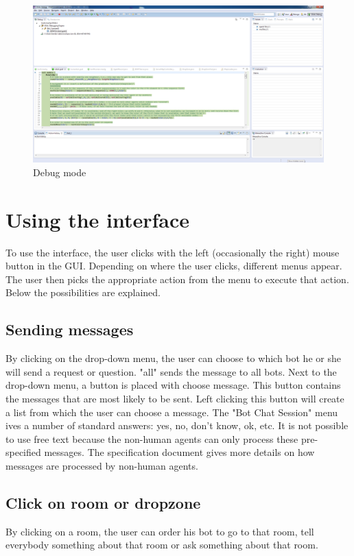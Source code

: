 \documentclass[11pt,a4paper]{article}
\begin{document}
\begin{figure}
    \includegraphics[width=\textwidth]{debugmode.png}
    \caption{Debug mode}\label{fig:Eclipse}
\end{figure}


\section{Using the interface}
To use the interface, the user clicks with the left (occasionally the right) mouse button in the GUI. Depending on where the user clicks, different menus appear. The user then picks the appropriate action from the menu to execute that action. Below the possibilities are explained.

\subsection{Sending messages}
By clicking on the drop-down menu, the user can choose to which bot he or she will send a request or question. "all" sends the message to all bots. Next to the drop-down menu, a button is placed with choose message. This button contains the messages that are most likely to be sent. Left clicking this button will create a list from which the user can choose a message. The "Bot Chat Session" menu ives a number of standard answers: yes, no, don't know, ok, etc. It is not possible to use free text because the non-human agents can only process these pre-specified messages. The specification document gives more details on how messages are processed by non-human agents.
\subsection{Click on room or dropzone}
By clicking on a room, the user can order his bot to go to that room, tell everybody something about that room or ask something about that room.
\end{document}
